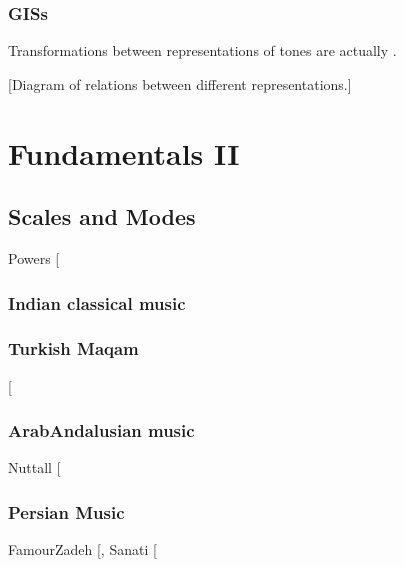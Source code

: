 \documentclass[letterpaper,10pt,english]{sphinxmanual}
\begin{document}
\subsection{GISs}
\label{\detokenize{1_fundamentals:giss}}
Transformations between representations of tones are actually .

{[}Diagram of relations between different representations.{]}


\chapter{Fundamentals II}
\label{\detokenize{1_fundamentals:fundamentals-ii}}

\section{Scales and Modes}
\label{\detokenize{1_fundamentals:scales-and-modes}}
Powers  {[}\sphinxcite{8_bibliography:id6}{]}


\subsection{Indian classical music}
\label{\detokenize{1_fundamentals:indian-classical-music}}

\subsection{Turkish Maqam}
\label{\detokenize{1_fundamentals:turkish-maqam}}
 {[}\sphinxcite{8_bibliography:id23}{]}


\subsection{Arab\sphinxhyphen{}Andalusian music}
\label{\detokenize{1_fundamentals:arab-andalusian-music}}
Nuttall  {[}\sphinxcite{8_bibliography:id32}{]}


\subsection{Persian Music}
\label{\detokenize{1_fundamentals:persian-music}}
FamourZadeh {[}\sphinxcite{8_bibliography:id30}{]}, Sanati {[}\sphinxcite{8_bibliography:id29}{]}
\end{document}
